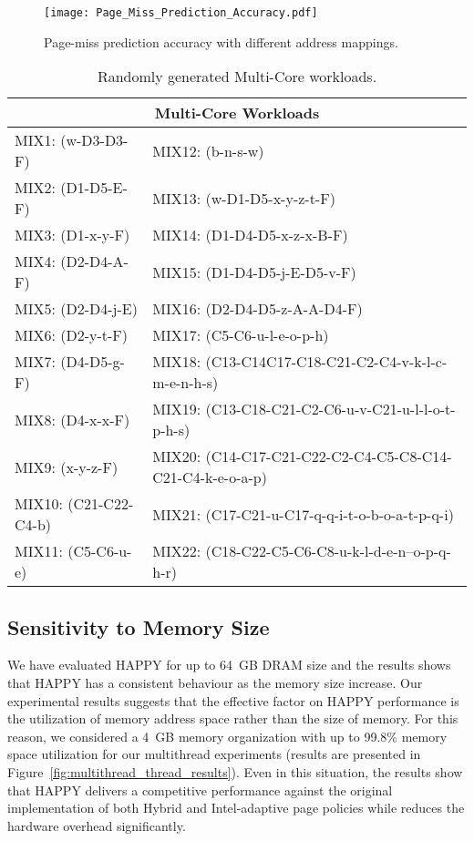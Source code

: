 \begin{figure}[!htb]
\centering
\texttt{[image: Page\_Miss\_Prediction\_Accuracy.pdf]}
\caption{Page-miss prediction accuracy with different address mappings.}
\label{fig:Mapping_Sens_Miss_graph}
\end{figure}






\begin{table*}[!htb]
\centering
  \begin{tabular}{| m{4cm} | m{12cm} | }
	\hline
	\multicolumn{2}{|c|}{\textbf{Multi-Core Workloads}} \\		
	\hline
	MIX1:  (w-D3-D3-F) & MIX12: (b-n-s-w)\\
	\hline
	MIX2:  (D1-D5-E-F) & MIX13: (w-D1-D5-x-y-z-t-F) \\
	\hline
	MIX3: (D1-x-y-F) & MIX14: (D1-D4-D5-x-z-x-B-F) \\
	\hline
	MIX4: (D2-D4-A-F) & MIX15: (D1-D4-D5-j-E-D5-v-F) \\
	\hline
	MIX5: (D2-D4-j-E) & MIX16: (D2-D4-D5-z-A-A-D4-F) \\
	\hline
	MIX6: (D2-y-t-F) & MIX17: (C5-C6-u-l-e-o-p-h) \\
	\hline
	MIX7: (D4-D5-g-F) & MIX18: (C13-C14C17-C18-C21-C2-C4-v-k-l-c-m-e-n-h-s) \\
	\hline
	MIX8: (D4-x-x-F) & MIX19: (C13-C18-C21-C2-C6-u-v-C21-u-l-l-o-t-p-h-s) \\
	\hline
	MIX9: (x-y-z-F) & MIX20: (C14-C17-C21-C22-C2-C4-C5-C8-C14-C21-C4-k-e-o-a-p) \\
	\hline
	MIX10: (C21-C22-C4-b) & MIX21: (C17-C21-u-C17-q-q-i-t-o-b-o-a-t-p-q-i) \\
	\hline
	MIX11: (C5-C6-u-e) & MIX22: (C18-C22-C5-C6-C8-u-k-l-d-e-n--o-p-q-h-r) \\	
	\hline

  \end{tabular}
  \caption{Randomly generated Multi-Core workloads. }
  \label{table:multicore_workloads}
\end{table*}

\subsection{Sensitivity to Memory Size}

We have evaluated HAPPY for up to 64~GB DRAM size and the results shows that HAPPY has a consistent behaviour as the memory size increase. Our experimental results suggests that the effective factor on HAPPY performance is the utilization of memory address space rather than the size of memory. For this reason, we considered a 4~GB memory organization with up to 99.8\% memory space utilization for our multithread experiments (results are presented in Figure~\ref{fig:multithread_thread_results}). Even in this situation, the results show that HAPPY delivers a competitive performance against the original implementation of both Hybrid and Intel-adaptive page policies while reduces the hardware overhead significantly. 




